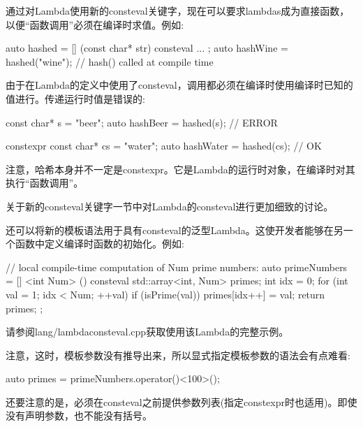 通过对Lambda使用新的consteval关键字，现在可以要求lambdas成为直接函数，以便“函数调用”必须在编译时求值。例如:

\begin{cpp}
auto hashed = [] (const char* str) consteval {
					...
				};
auto hashWine = hashed("wine"); // hash() called at compile time
\end{cpp}

由于在Lambda的定义中使用了consteval，调用都必须在编译时使用编译时已知的值进行。传递运行时值是错误的:

\begin{cpp}
const char* s = "beer";
auto hashBeer = hashed(s); // ERROR

constexpr const char* cs = "water";
auto hashWater = hashed(cs); // OK
\end{cpp}

注意，哈希本身并不一定是constexpr。它是Lambda的运行时对象，在编译时对其执行“函数调用”。

关于新的consteval关键字一节中对Lambda的consteval进行更加细致的讨论。

还可以将新的模板语法用于具有consteval的泛型Lambda。这使开发者能够在另一个函数中定义编译时函数的初始化。例如:

\begin{cpp}
// local compile-time computation of Num prime numbers:
auto primeNumbers = [] <int Num> () consteval {
					std::array<int, Num> primes;
					int idx = 0;
					for (int val = 1; idx < Num; ++val) {
						if (isPrime(val)) {
							primes[idx++] = val;
						}
					}
					return primes;
				};
\end{cpp}

请参阅lang/lambdaconsteval.cpp获取使用该Lambda的完整示例。

注意，这时，模板参数没有推导出来，所以显式指定模板参数的语法会有点难看:

\begin{cpp}
auto primes = primeNumbers.operator()<100>();
\end{cpp}

还要注意的是，必须在consteval之前提供参数列表(指定constexpr时也适用)。即使没有声明参数，也不能没有括号。




